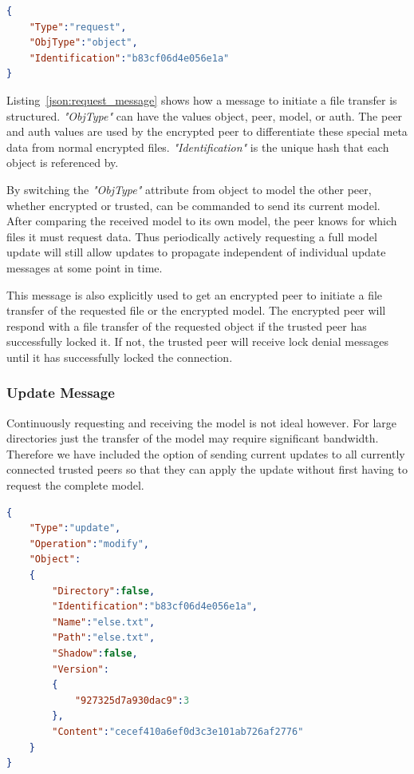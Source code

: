 \begin{listing}[htp]
    \begin{lstlisting}[language=json,firstnumber=0]
{
    "Type":"request",
    "ObjType":"object",
    "Identification":"b83cf06d4e056e1a"
}
    \end{lstlisting}
\caption[Request Message]{Example of a JSON request message.}
\label{json:request_message}
\end{listing}

Listing~\ref{json:request_message} shows how a message to initiate a file transfer is structured.
\textit{"ObjType"} can have the values object, peer, model, or auth.
The peer and auth values are used by the encrypted peer to differentiate these special meta data from normal encrypted files.
\textit{"Identification"} is the unique hash that each object is referenced by.

By switching the \textit{"ObjType"} attribute from object to model the other peer, whether encrypted or trusted, can be commanded to send its current model.
After comparing the received model to its own model, the peer knows for which files it must request data.
Thus periodically actively requesting a full model update will still allow updates to propagate independent of individual update messages at some point in time.

This message is also explicitly used to get an encrypted peer to initiate a file transfer of the requested file or the encrypted model.
The encrypted peer will respond with a file transfer of the requested object if the trusted peer has successfully locked it.
If not, the trusted peer will receive lock denial messages until it has successfully locked the connection.

\subsubsection{Update Message}
\label{subs:Update Message}

Continuously requesting and receiving the model is not ideal however.
For large directories just the transfer of the model may require significant bandwidth.
Therefore we have included the option of sending current updates to all currently connected trusted peers so that they can apply the update without first having to request the complete model.

\begin{listing}[htp]
    \begin{lstlisting}[language=json,firstnumber=0]
{
    "Type":"update",
    "Operation":"modify",
    "Object":
    {
        "Directory":false,
        "Identification":"b83cf06d4e056e1a",
        "Name":"else.txt",
        "Path":"else.txt",
        "Shadow":false,
        "Version":
        {
            "927325d7a930dac9":3
        },
        "Content":"cecef410a6ef0d3c3e101ab726af2776"
    }
}
    \end{lstlisting}
\caption[Update Object Message]{The message broadcast by a peer to connected peers to notify that an update has happened.}
\label{json:update_object}
\end{listing}


